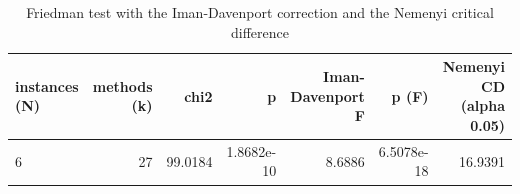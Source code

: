 \begin{table}[htbp]
\centering
\small
\caption{Friedman test with the Iman-Davenport correction and the Nemenyi critical difference}
\label{tab:E0_sanity_b5_friedman_test}
\begin{tabular}{lrrrrrr}
\toprule
instances (N) & methods (k) & chi2 & p & Iman-Davenport F & p (F) & Nemenyi CD (alpha 0.05) \\
\midrule
6 & 27 & 99.0184 & 1.8682e-10 & 8.6886 & 6.5078e-18 & 16.9391 \\
\bottomrule
\end{tabular}
\end{table}
